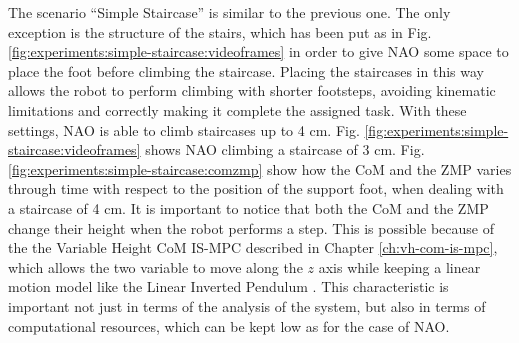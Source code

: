 The scenario ``Simple Staircase'' is similar to the previous one. The only 
exception is the structure of the stairs, which has been put as in Fig.
\ref{fig:experiments:simple-staircase:videoframes} in order to give NAO 
some space to place the foot before climbing the staircase. Placing the 
staircases in this way allows the robot to perform climbing with shorter 
footsteps, avoiding kinematic limitations and correctly making it complete 
the assigned task. With these settings, NAO is able to climb staircases
up to 4 cm.
Fig. \ref{fig:experiments:simple-staircase:videoframes} shows NAO climbing 
a staircase of 3 cm. Fig. \ref{fig:experiments:simple-staircase:comzmp} show 
how the CoM and the ZMP varies through time with respect to the position of the 
support foot, when dealing with a staircase of 4 cm. It is important to notice 
that both the CoM and the ZMP change their height when the robot performs a
step. This 
is possible because of the the Variable Height CoM IS-MPC described in Chapter 
\ref{ch:vh-com-is-mpc}, which allows the two variable to move along the $z$ 
axis while keeping a linear motion model like the Linear Inverted Pendulum
\cite{DBLP:conf/humanoids/SciancaCSLO16}. This characteristic is important 
not just in terms of the analysis of the system, but also in terms of 
computational resources, which can be kept low as for the case of NAO.
